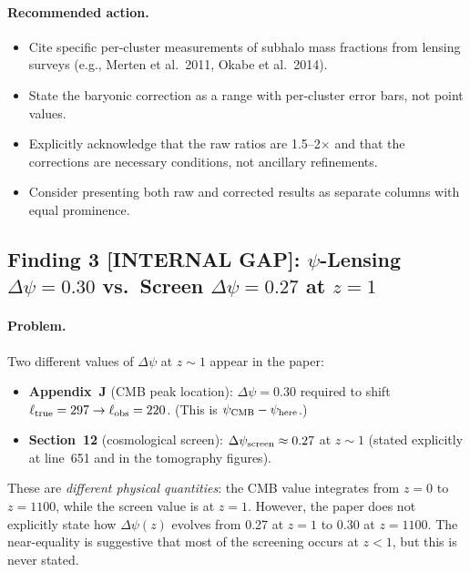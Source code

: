 \paragraph{Recommended action.}
\begin{itemize}
\item Cite specific per-cluster measurements of subhalo mass fractions
  from lensing surveys (e.g., Merten et al.\ 2011, Okabe et al.\ 2014).
\item State the baryonic correction as a range with per-cluster error
  bars, not point values.
\item Explicitly acknowledge that the raw ratios are 1.5--2$\times$
  and that the corrections are necessary conditions, not ancillary
  refinements.
\item Consider presenting both raw and corrected results as separate
  columns with equal prominence.
\end{itemize}

\subsection*{Finding 3 [INTERNAL GAP]:
$\psi$-Lensing $\Delta\psi = 0.30$ vs.\ Screen $\Delta\psi = 0.27$ at
$z = 1$}

\paragraph{Problem.}
Two different values of $\Delta\psi$ at $z \sim 1$ appear in the paper:

\begin{itemize}
\item \textbf{Appendix~J} (CMB peak location): $\Delta\psi = 0.30$
  required to shift $\ell_{\rm true} = 297 \to \ell_{\rm obs} = 220$.
  (This is $\psi_{\rm CMB} - \psi_{\rm here}$.)
\item \textbf{Section~12} (cosmological screen): $\Delta\psi_{\rm
  screen} \approx 0.27$ at $z \sim 1$ (stated explicitly at line~651
  and in the tomography figures).
\end{itemize}

These are \emph{different physical quantities}: the CMB value integrates
from $z = 0$ to $z = 1100$, while the screen value is at $z = 1$.
However, the paper does not explicitly state how $\Delta\psi(z)$ evolves
from 0.27 at $z = 1$ to 0.30 at $z = 1100$.  The near-equality is
suggestive that most of the screening occurs at $z < 1$, but this is
never stated.

